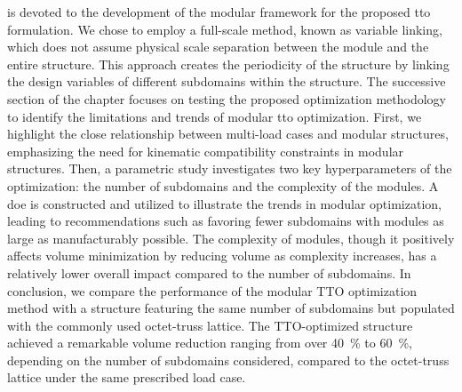  is devoted to the development of the modular framework for the proposed \gls{tto} formulation. We chose to employ a full-scale method, known as variable linking, which does not assume physical scale separation between the module and the entire structure. This approach creates the periodicity of the structure by linking the design variables of different subdomains within the structure. The successive section of the chapter focuses on testing the proposed optimization methodology to identify the limitations and trends of modular \gls{tto} optimization. First, we highlight the close relationship between multi-load cases and modular structures, emphasizing the need for kinematic compatibility constraints in modular structures. Then, a parametric study investigates two key hyperparameters of the optimization: the number of subdomains and the complexity of the modules. A \gls{doe} is constructed and utilized to illustrate the trends in modular optimization, leading to recommendations such as favoring fewer subdomains with modules as large as manufacturably possible. The complexity of modules, though it positively affects volume minimization by reducing volume as complexity increases, has a relatively lower overall impact compared to the number of subdomains.  In conclusion, we compare the performance of the modular TTO optimization method with a structure featuring the same number of subdomains but populated with the commonly used octet-truss lattice. The TTO-optimized structure achieved a remarkable volume reduction ranging from over \qty{40}{\%} to \qty{60}{\%}, depending on the number of subdomains considered, compared to the octet-truss lattice under the same prescribed load case.

